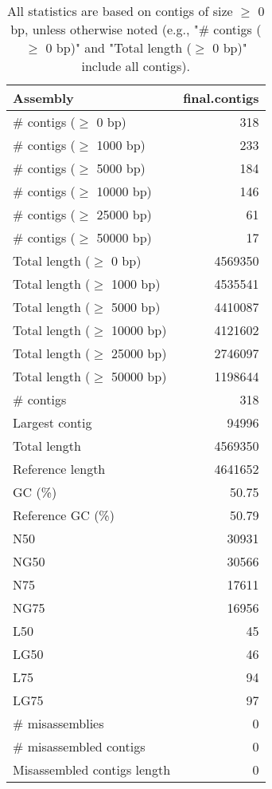 \documentclass[12pt,a4paper]{article}
\begin{document}
\begin{table}[ht]
\begin{center}
\caption{All statistics are based on contigs of size $\geq$ 0 bp, unless otherwise noted (e.g., "\# contigs ($\geq$ 0 bp)" and "Total length ($\geq$ 0 bp)" include all contigs).}
\begin{tabular}{|l*{1}{|r}|}
\hline
Assembly & final.contigs \\ \hline
\# contigs ($\geq$ 0 bp) & 318 \\ \hline
\# contigs ($\geq$ 1000 bp) & 233 \\ \hline
\# contigs ($\geq$ 5000 bp) & 184 \\ \hline
\# contigs ($\geq$ 10000 bp) & 146 \\ \hline
\# contigs ($\geq$ 25000 bp) & 61 \\ \hline
\# contigs ($\geq$ 50000 bp) & 17 \\ \hline
Total length ($\geq$ 0 bp) & 4569350 \\ \hline
Total length ($\geq$ 1000 bp) & 4535541 \\ \hline
Total length ($\geq$ 5000 bp) & 4410087 \\ \hline
Total length ($\geq$ 10000 bp) & 4121602 \\ \hline
Total length ($\geq$ 25000 bp) & 2746097 \\ \hline
Total length ($\geq$ 50000 bp) & 1198644 \\ \hline
\# contigs & 318 \\ \hline
Largest contig & 94996 \\ \hline
Total length & 4569350 \\ \hline
Reference length & 4641652 \\ \hline
GC (\%) & 50.75 \\ \hline
Reference GC (\%) & 50.79 \\ \hline
N50 & 30931 \\ \hline
NG50 & 30566 \\ \hline
N75 & 17611 \\ \hline
NG75 & 16956 \\ \hline
L50 & 45 \\ \hline
LG50 & 46 \\ \hline
L75 & 94 \\ \hline
LG75 & 97 \\ \hline
\# misassemblies & 0 \\ \hline
\# misassembled contigs & 0 \\ \hline
Misassembled contigs length & 0 \\ \hline

\end{tabular}
\end{center}
\end{table}
\end{document}
